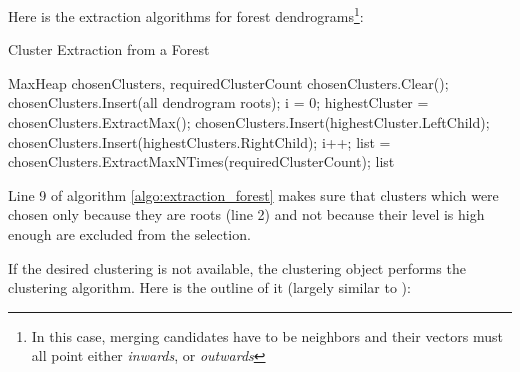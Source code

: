 Here is the extraction algorithms for forest dendrograms\footnote{In this case, merging candidates have to be neighbors and their vectors must all point either {\it inwards}, or {\it outwards}}:

\begin{algorithm}[H]
\caption{Cluster Extraction from a Forest}
\label{algo:extraction_forest}
\begin{algorithmic}[1]

\Require MaxHeap chosenClusters, requiredClusterCount
\Statex
\State chosenClusters.Clear();
\State chosenClusters.Insert(all dendrogram roots);
\State i = 0;
	\State highestCluster = chosenClusters.ExtractMax();
    \State chosenClusters.Insert(highestCluster.LeftChild);
    \State chosenClusters.Insert(highestClusters.RightChild);
    \State i++;
\EndWhile
\State list = chosenClusters.ExtractMaxNTimes(requiredClusterCount);
\Statex
\Return list
\end{algorithmic}
\end{algorithm}

Line 9 of algorithm \ref{algo:extraction_forest} makes sure that clusters which were chosen only because they are roots (line 2) and not because their level is high enough are excluded from the selection.

If the desired clustering is not available, the clustering object performs the clustering algorithm. Here is the outline of it (largely similar to \citet{Telea99}):

